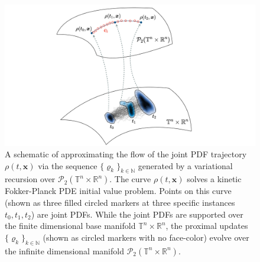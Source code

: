 \documentclass[10pt,twocolumn]{IEEEtran}
\begin{document}
\begin{figure}[tb]
\centering
\includegraphics[width=0.9\linewidth]{ProxSchmatic.pdf}
\caption{\small{A schematic of approximating the flow of the joint PDF trajectory $\rho(t,\bm{x})$ via the sequence $\{\varrho_{k}\}_{k\in\mathbb{N}}$ generated by a variational recursion over $\mathcal{P}_{2}\left(\mathbb{T}^{n}\times\mathbb{R}^{n}\right)$. The curve $\rho(t,\bm{x})$ solves a kinetic Fokker-Planck PDE initial value problem. Points on this curve (shown as three filled circled markers at three specific instances $t_0,t_1,t_2$) are joint PDFs. While the joint PDFs are supported over the finite dimensional base manifold $\mathbb{T}^{n}\times\mathbb{R}^{n}$, the proximal updates $\{\varrho_{k}\}_{k\in\mathbb{N}}$ (shown as circled markers with no face-color) evolve over the infinite dimensional manifold $\mathcal{P}_{2}\left(\mathbb{T}^{n}\times\mathbb{R}^{n}\right)$.}}
\vspace*{-0.1in}
\label{fig:ProxSchematic}
\end{figure}
\end{document}
